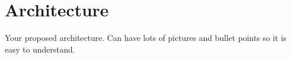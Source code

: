 
% 
% 
\section{Architecture}

Your proposed architecture. Can have lots of pictures and bullet points so it is easy to understand.

